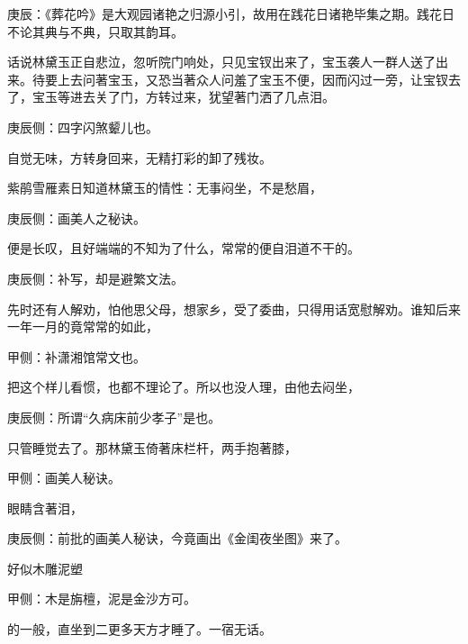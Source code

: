 
\begin{parag}
    \begin{note}庚辰：《葬花吟》是大观园诸艳之归源小引，故用在践花日诸艳毕集之期。践花日不论其典与不典，只取其韵耳。\end{note}
\end{parag}


\begin{parag}
    话说林黛玉正自悲泣，忽听院门响处，只见宝钗出来了，宝玉袭人一群人送了出来。待要上去问著宝玉，又恐当著众人问羞了宝玉不便，因而闪过一旁，让宝钗去了，宝玉等进去关了门，方转过来，犹望著门洒了几点泪。\begin{note}庚辰侧：四字闪煞颦儿也。\end{note}自觉无味，方转身回来，无精打彩的卸了残妆。
\end{parag}


\begin{parag}
    紫鹃雪雁素日知道林黛玉的情性：无事闷坐，不是愁眉，\begin{note}庚辰侧：画美人之秘诀。\end{note}便是长叹，且好端端的不知为了什么，常常的便自泪道不干的。\begin{note}庚辰侧：补写，却是避繁文法。\end{note}先时还有人解劝，怕他思父母，想家乡，受了委曲，只得用话宽慰解劝。谁知后来一年一月的竟常常的如此，\begin{note}甲侧：补潇湘馆常文也。\end{note}把这个样儿看惯，也都不理论了。所以也没人理，由他去闷坐，\begin{note}庚辰侧：所谓“久病床前少孝子”是也。\end{note}只管睡觉去了。那林黛玉倚著床栏杆，两手抱著膝，\begin{note}甲侧：画美人秘诀。\end{note}眼睛含著泪，\begin{note}庚辰侧：前批的画美人秘诀，今竟画出《金闺夜坐图》来了。\end{note}好似木雕泥塑\begin{note}甲侧：木是旃檀，泥是金沙方可。\end{note}的一般，直坐到二更多天方才睡了。一宿无话。
\end{parag}


